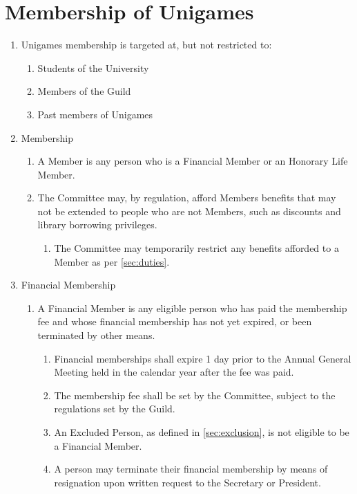 \documentclass[a4paper]{article}
\begin{document}
\section{Membership of Unigames} \label{sec:membership}
\begin{enumerate}
    \item Unigames membership is targeted at, but not restricted to:
          \begin{enumerate}
              \item Students of the University
              \item Members of the Guild
              \item Past members of Unigames
          \end{enumerate}
    \item Membership
          \begin{enumerate}
              \item A Member is any person who is a Financial Member or an Honorary Life Member.
              \item The Committee may, by regulation, afford Members benefits that may not be extended to people who are not Members, such as discounts and library borrowing privileges.
              \begin{enumerate}
                  \item The Committee may temporarily restrict any benefits afforded to a Member as per \cref{sec:duties}.
              \end{enumerate}
          \end{enumerate}
    \item Financial Membership
        \begin{enumerate}
              \item A Financial Member is any eligible person who has paid the membership fee and whose financial membership has not yet expired, or been terminated by other means.
              \begin{enumerate}
                  \item Financial memberships shall expire 1 day prior to the Annual General Meeting held in the calendar year after the fee was paid.
                  \item The membership fee shall be set by the Committee, subject to the regulations set by the Guild.
                  \item An Excluded Person, as defined in \cref{sec:exclusion}, is not eligible to be a Financial Member.
                  \item A person may terminate their financial membership by means of resignation upon written request to the Secretary or President.

\end{enumerate}
\end{enumerate}
\end{enumerate}
\end{document}
